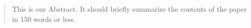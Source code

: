 \begin{abstract}
This is our Abstract. It should briefly summarize the contents of the paper in 150 words or less. 
\end{abstract}